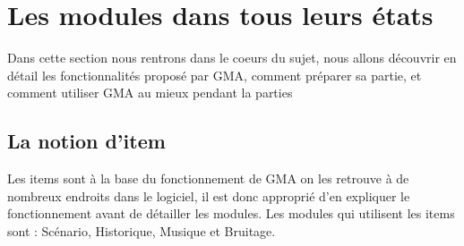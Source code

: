 \documentclass[12pt]{article}
\begin{document}
\section{Les modules dans tous leurs états}\label{details}
Dans cette section nous rentrons dans le coeurs du sujet, nous allons découvrir en détail les fonctionnalités proposé par GMA, comment préparer sa partie, et comment utiliser GMA au mieux pendant la parties

\subsection{La notion d'item}\label{item}
Les items sont à la base du fonctionnement de GMA on les retrouve à de nombreux endroits dans le logiciel, il est donc approprié d'en expliquer le fonctionnement avant de détailler les modules.
Les modules qui utilisent les items sont : Scénario, Historique, Musique et Bruitage.
\end{document}
